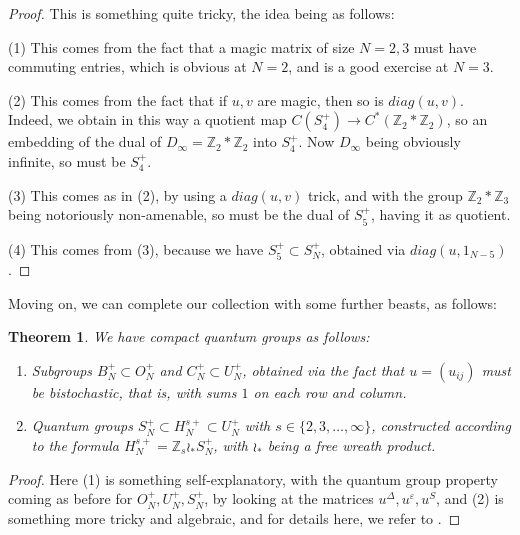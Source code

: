 \documentclass[12pt]{amsbook}
\newtheorem{theorem}{Theorem}[chapter]
\begin{document}
\begin{proof}
This is something quite tricky, the idea being as follows:

\medskip

(1) This comes from the fact that a magic matrix of size $N=2,3$ must have commuting entries, which is obvious at $N=2$, and is a good exercise at $N=3$.

\medskip

(2) This comes from the fact that if $u,v$ are magic, then so is $diag(u,v)$. Indeed, we obtain in this way a quotient map $C(S_4^+)\to C^*(\mathbb Z_2*\mathbb Z_2)$, so an embedding of the dual of $D_\infty=\mathbb Z_2*\mathbb Z_2$ into $S_4^+$. Now $D_\infty$ being obviously infinite, so must be $S_4^+$.

\medskip

(3) This comes as in (2), by using a $diag(u,v)$ trick, and with the group $\mathbb Z_2*\mathbb Z_3$ being notoriously non-amenable, so must be the dual of $S_5^+$, having it as quotient.

\medskip

(4) This comes from (3), because we have $S_5^+\subset S_N^+$, obtained via $diag(u,1_{N-5})$.
\end{proof}

Moving on, we can complete our collection with some further beasts, as follows:

\begin{theorem}
We have compact quantum groups as follows:
\begin{enumerate}
\item Subgroups $B_N^+\subset O_N^+$ and $C_N^+\subset U_N^+$, obtained via the fact that $u=(u_{ij})$ must be bistochastic, that is, with sums $1$ on each row and column.

\item Quantum groups $S_N^+\subset H_N^{s+}\subset U_N^+$ with $s\in\{2,3,\ldots,\infty\}$, constructed according to the formula $H_N^{s+}=\mathbb Z_s\wr_*S_N^+$, with $\wr_*$ being a free wreath product.
\end{enumerate}
\end{theorem}

\begin{proof}
Here (1) is something self-explanatory, with the quantum group property coming as before for $O_N^+,U_N^+,S_N^+$, by looking at the matrices $u^\Delta,u^\varepsilon,u^S$, and (2) is something more tricky and algebraic, and for details here, we refer to \cite{bb+}. 
\end{proof}
\end{document}
